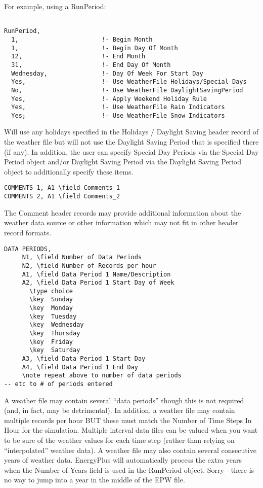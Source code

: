 For example, using a RunPeriod:

\begin{lstlisting}

RunPeriod,
  1,                       !- Begin Month
  1,                       !- Begin Day Of Month
  12,                      !- End Month
  31,                      !- End Day Of Month
  Wednesday,               !- Day Of Week For Start Day
  Yes,                     !- Use WeatherFile Holidays/Special Days
  No,                      !- Use WeatherFile DaylightSavingPeriod
  Yes,                     !- Apply Weekend Holiday Rule
  Yes,                     !- Use WeatherFile Rain Indicators
  Yes;                     !- Use WeatherFile Snow Indicators
\end{lstlisting}

Will use any holidays specified in the Holidays / Daylight Saving header record of the weather file but will not use the Daylight Saving Period that is specified there (if any). In addition, the user can specify Special Day Periods via the Special Day Period object and/or Daylight Saving Period via the Daylight Saving Period object to additionally specify these items.

\begin{lstlisting}
COMMENTS 1, A1 \field Comments_1
COMMENTS 2, A1 \field Comments_2
\end{lstlisting}

The Comment header records may provide additional information about the weather data source or other information which may not fit in other header record formats.

\begin{lstlisting}
DATA PERIODS,
     N1, \field Number of Data Periods
     N2, \field Number of Records per hour
     A1, \field Data Period 1 Name/Description
     A2, \field Data Period 1 Start Day of Week
       \type choice
       \key  Sunday
       \key  Monday
       \key  Tuesday
       \key  Wednesday
       \key  Thursday
       \key  Friday
       \key  Saturday
     A3, \field Data Period 1 Start Day
     A4, \field Data Period 1 End Day
     \note repeat above to number of data periods
-- etc to # of periods entered
\end{lstlisting}

A weather file may contain several ``data periods'' though this is not required (and, in fact, may be detrimental). In addition, a weather file may contain multiple records per hour BUT these must match the Number of Time Steps In Hour for the simulation. Multiple interval data files can be valued when you want to be sure of the weather values for each time step (rather than relying on ``interpolated'' weather data). A weather file may also contain several consecutive years of weather data. EnergyPlus will automatically process the extra years when the Number of Years field is used in the RunPeriod object. Sorry - there is no way to jump into a year in the middle of the EPW file.

